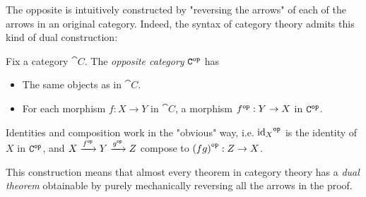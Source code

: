 


The opposite  is intuitively constructed by "reversing the arrows"
of each of the arrows in an original category. Indeed, the syntax of category
theory admits this kind of dual construction:

\begin{dfn*}
	Fix a category $\cat{C}$. The \emph{opposite category} ${{{\normalfont\texttt{C}}}^{{\normalfont\texttt{op}}}}$ has
	\begin{itemize}
		\item The same objects as in $\cat{C}$.
		\item For each morphism $f: X\rightarrow Y$ in $\cat{C}$, a morphism
		      ${{f}^{{\normalfont\texttt{op}}}}: Y\rightarrow X$ in ${{{\normalfont\texttt{C}}}^{{\normalfont\texttt{op}}}}$.
	\end{itemize}

	Identities and composition work in the "obvious" way, i.e. ${{\operatorname{id}_X}^{{\normalfont\texttt{op}}}}$ is the
	identity of $X$ in ${{{\normalfont\texttt{C}}}^{{\normalfont\texttt{op}}}}$, and
	$X\xrightarrow{{{f}^{{\normalfont\texttt{op}}}}}Y\xrightarrow{{{g}^{{\normalfont\texttt{op}}}}}Z$ compose to ${{(fg)}^{{\normalfont\texttt{op}}}}:
		Z\rightarrow X$.
\end{dfn*}

This construction means that almost every theorem in category theory has a
\emph{dual theorem} obtainable by purely mechanically reversing all the arrows
in the proof.


